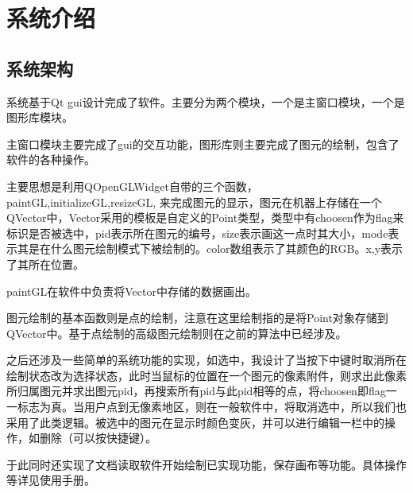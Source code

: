 \documentclass[a4paper,UTF8]{article}
\theoremstyle{definition}
\begin{document}
\section{系统介绍}
\subsection{系统架构}
系统基于Qt gui设计完成了软件。主要分为两个模块，一个是主窗口模块，一个是图形库模块。
\par 主窗口模块主要完成了gui的交互功能，图形库则主要完成了图元的绘制，包含了软件的各种操作。
\par 主要思想是利用QOpenGLWidget自带的三个函数，paintGL,initializeGL,resizeGL, 来完成图元的显示，图元在机器上存储在一个QVector中，Vector采用的模板是自定义的Point类型，类型中有choosen作为flag来标识是否被选中，pid表示所在图元的编号，size表示画这一点时其大小，mode表示其是在什么图元绘制模式下被绘制的。color数组表示了其颜色的RGB。x,y表示了其所在位置。
\par paintGL在软件中负责将Vector中存储的数据画出。
\par 图元绘制的基本函数则是点的绘制，注意在这里绘制指的是将Point对象存储到QVector中。基于点绘制的高级图元绘制则在之前的算法中已经涉及。
\par 之后还涉及一些简单的系统功能的实现，如选中，我设计了当按下中键时取消所在绘制状态改为选择状态，此时当鼠标的位置在一个图元的像素附件，则求出此像素所归属图元并求出图元pid，再搜索所有pid与此pid相等的点，将choosen即flag一一标志为真。当用户点到无像素地区，则在一般软件中，将取消选中，所以我们也采用了此类逻辑。被选中的图元在显示时颜色变灰，并可以进行编辑一栏中的操作，如删除（可以按快捷键）。
\par 于此同时还实现了文档读取软件开始绘制已实现功能，保存画布等功能。具体操作等详见使用手册。
\end{document}
